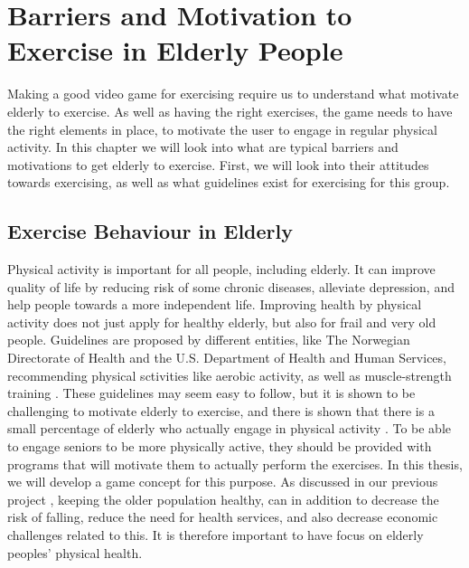 \chapter{Barriers and Motivation to Exercise in Elderly People  }
\label{chap:olderexercise}
Making a good video game for exercising require us to understand what motivate elderly to exercise. As well as having the right exercises, the game needs to have the right elements in place, to motivate the user to engage in regular physical activity. In this chapter we will look into what are typical barriers and motivations to get elderly to exercise. First, we will look into their attitudes towards exercising, as well as what guidelines exist for exercising for this group.  

\section{Exercise Behaviour in Elderly}
Physical activity is important for all people, including elderly. It can improve quality of life by reducing risk of some chronic diseases, alleviate depression, and help people towards a more independent life. Improving health by physical activity does not just apply for healthy elderly, but also for frail and very old people. Guidelines are proposed by different entities, like The Norwegian Directorate of Health and the U.S. Department of Health and Human Services, recommending physical sctivities like aerobic activity, as well as muscle-strength training \cite{aktivitetsbok} \cite{guidelines}. These guidelines  may seem easy to follow, but it is shown to be challenging to motivate elderly to exercise, and there is shown that there is a small percentage of elderly who actually engage in physical activity \cite{olderamericans}. To be able to engage seniors to be more physically active, they should be provided with programs that will motivate them to actually perform the exercises. In this thesis, we will develop a game concept for this purpose.   As discussed in our previous project \cite{project}, keeping the older population healthy, can in addition to decrease the risk of falling, reduce the need for health services, and also decrease economic challenges related to this.  It is therefore important to have focus on elderly peoples' physical health. 

